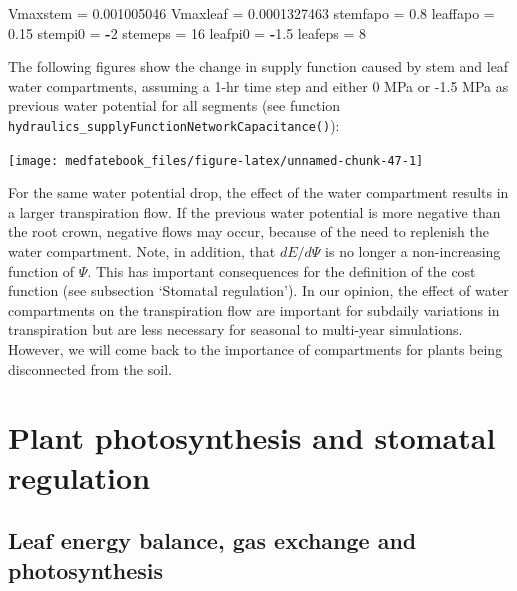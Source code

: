 \documentclass[]{book}
\newenvironment{Shaded}{\begin{snugshade}}{\end{snugshade}}
\newcommand{\DecValTok}[1]{\textcolor[rgb]{0.00,0.00,0.81}{#1}}
\newcommand{\FloatTok}[1]{\textcolor[rgb]{0.00,0.00,0.81}{#1}}
\newcommand{\StringTok}[1]{\textcolor[rgb]{0.31,0.60,0.02}{#1}}
\newcommand{\OperatorTok}[1]{\textcolor[rgb]{0.81,0.36,0.00}{\textbf{#1}}}
\newcommand{\NormalTok}[1]{#1}
\begin{document}
\begin{Shaded}
\begin{Highlighting}[]
\NormalTok{Vmaxstem =}\StringTok{ }\FloatTok{0.001005046}
\NormalTok{Vmaxleaf =}\StringTok{ }\FloatTok{0.0001327463}
\NormalTok{stemfapo =}\StringTok{ }\FloatTok{0.8}
\NormalTok{leaffapo =}\StringTok{ }\FloatTok{0.15}
\NormalTok{stempi0 =}\StringTok{ }\OperatorTok{-}\DecValTok{2}
\NormalTok{stemeps =}\StringTok{ }\DecValTok{16}
\NormalTok{leafpi0 =}\StringTok{ }\OperatorTok{-}\FloatTok{1.5}
\NormalTok{leafeps =}\StringTok{ }\DecValTok{8}
\end{Highlighting}
\end{Shaded}

The following figures show the change in supply function caused by stem
and leaf water compartments, assuming a 1-hr time step and either 0 MPa
or -1.5 MPa as previous water potential for all segments (see function
\texttt{hydraulics\_supplyFunctionNetworkCapacitance()}):

\begin{center}\texttt{[image: medfatebook\_files/figure-latex/unnamed-chunk-47-1]} \end{center}

For the same water potential drop, the effect of the water compartment
results in a larger transpiration flow. If the previous water potential
is more negative than the root crown, negative flows may occur, because
of the need to replenish the water compartment. Note, in addition, that
\(dE/d\Psi\) is no longer a non-increasing function of \(\Psi\). This
has important consequences for the definition of the cost function (see
subsection `Stomatal regulation'). In our opinion, the effect of water
compartments on the transpiration flow are important for subdaily
variations in transpiration but are less necessary for seasonal to
multi-year simulations. However, we will come back to the importance of
compartments for plants being disconnected from the soil.

\chapter{Plant photosynthesis and stomatal
regulation}\label{plant-photosynthesis-and-stomatal-regulation}

\section{Leaf energy balance, gas exchange and
photosynthesis}\label{leaf-energy-balance-gas-exchange-and-photosynthesis}
\end{document}
